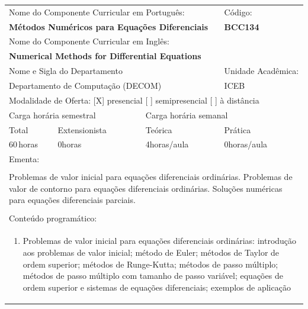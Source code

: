 \documentclass[11pt]{article}
\begin{document}
\begin{center}
\begin{longtable}{|p{4cm}|p{4cm}|p{4cm}|p{4cm}|}
\hline
\multicolumn{3}{|p{12cm}|}{Nome do Componente Curricular em Português:} &
\multicolumn{1}{p{4cm}|}{Código:} \\ 
\multicolumn{3}{|p{12cm}|}{\textbf{Métodos Numéricos para Equações Diferenciais}} &
\textbf{BCC134}\\ 
\multicolumn{3}{|p{12cm}|}{Nome do Componente Curricular em Inglês:} & \\ 
\multicolumn{3}{|p{12cm}|}{\textbf{Numerical Methods for Differential Equations}} & \\ 
\hline
\multicolumn{3}{|p{12cm}|}{Nome e Sigla do Departamento} & Unidade Acadêmica: \\ 
\multicolumn{3}{|p{12cm}|}{Departamento de Computação (DECOM)} & {ICEB} \\ 
\hline
\multicolumn{4}{|p{16cm}|}{Modalidade de Oferta:
[X] presencial \hspace{0.6cm}
[ ] semipresencial \hspace{0.6cm}
[ ] à distância}\\
\hline
\multicolumn{2}{|p{8cm}|}{Carga horária semestral} &
\multicolumn{2}{p{8cm}|}{Carga horária semanal}\\
\hline
\multicolumn{1}{|p{4cm}|}{Total} &
\multicolumn{1}{p{4cm}|}{Extensionista} &
\multicolumn{1}{p{4cm}|}{Teórica} &
\multicolumn{1}{p{4cm}|}{Prática} \\ 
\multicolumn{1}{|p{4cm}|}{60\,horas} &
\multicolumn{1}{p{4cm}|}{0\;horas} &
\multicolumn{1}{p{4cm}|}{4\;horas/aula} &
\multicolumn{1}{p{4cm}|}{0\;horas/aula} \\ 
\hline
\multicolumn{4}{|p{16cm}|}{Ementa:}\\
\multicolumn{4}{|p{16cm}|}{}\\
\multicolumn{4}{|p{\dimexpr 16cm + 6\tabcolsep\relax}|}{Problemas de valor inicial para equações diferenciais ordinárias. Problemas de valor de contorno para equações diferenciais ordinárias. Soluções numéricas para equações diferenciais parciais.}\\
\multicolumn{4}{|p{16cm}|}{}\\
\hline
\multicolumn{4}{|p{16cm}|}{Conteúdo programático:}\\*
\multicolumn{4}{|p{\dimexpr 16cm + 6\tabcolsep\relax}|}{\begin{enumerate}[start=1]\item Problemas de valor inicial para equações diferenciais ordinárias: introdução aos problemas de valor inicial; método de Euler; métodos de Taylor de ordem superior; métodos de Runge-Kutta; métodos de passo múltiplo; métodos de passo múltiplo com tamanho de passo variável; equações de ordem superior e sistemas de equações diferenciais; exemplos de aplicação\end{enumerate}}\\

\end{longtable}
\end{center}
\end{document}
